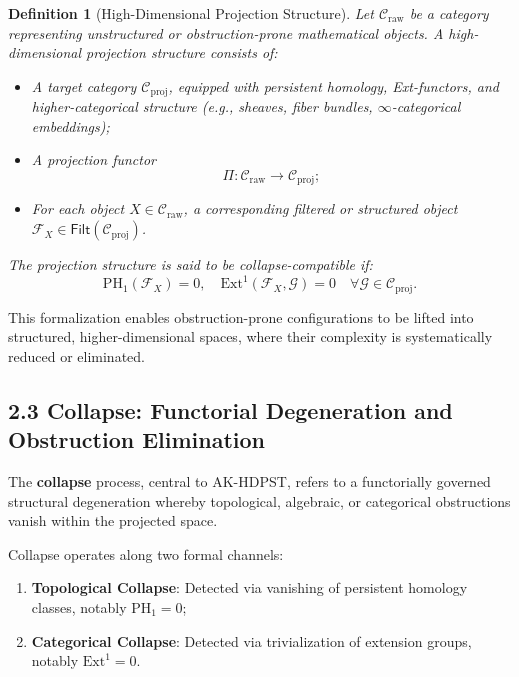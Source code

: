 \documentclass[11pt]{article}
\newtheorem{definition}[theorem]{Definition}
\begin{document}
\begin{definition}[High-Dimensional Projection Structure]
Let \( \mathcal{C}_{\mathrm{raw}} \) be a category representing unstructured or obstruction-prone mathematical objects.  
A \emph{high-dimensional projection structure} consists of:

\begin{itemize}
    \item A target category \( \mathcal{C}_{\mathrm{proj}} \), equipped with persistent homology, Ext-functors, and higher-categorical structure (e.g., sheaves, fiber bundles, $\infty$-categorical embeddings);
    \item A projection functor
    \[
    \Pi : \mathcal{C}_{\mathrm{raw}} \longrightarrow \mathcal{C}_{\mathrm{proj}};
    \]
    \item For each object \( X \in \mathcal{C}_{\mathrm{raw}} \), a corresponding filtered or structured object \( \mathcal{F}_X \in \mathsf{Filt}(\mathcal{C}_{\mathrm{proj}}) \).
\end{itemize}

The projection structure is said to be \emph{collapse-compatible} if:
\[
\mathrm{PH}_1(\mathcal{F}_X) = 0, \quad \mathrm{Ext}^1(\mathcal{F}_X, \mathcal{G}) = 0 \quad \forall \mathcal{G} \in \mathcal{C}_{\mathrm{proj}}.
\]
\end{definition}

This formalization enables obstruction-prone configurations to be lifted into structured, higher-dimensional spaces, where their complexity is systematically reduced or eliminated.

\subsection*{2.3 Collapse: Functorial Degeneration and Obstruction Elimination}

The \textbf{collapse} process, central to AK-HDPST, refers to a functorially governed structural degeneration whereby topological, algebraic, or categorical obstructions vanish within the projected space.

Collapse operates along two formal channels:

\begin{enumerate}
    \item \textbf{Topological Collapse}: Detected via vanishing of persistent homology classes, notably \( \mathrm{PH}_1 = 0 \);
    \item \textbf{Categorical Collapse}: Detected via trivialization of extension groups, notably \( \mathrm{Ext}^1 = 0 \).
\end{enumerate}
\end{document}
